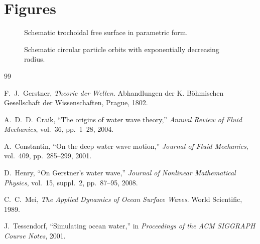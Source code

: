 \documentclass[journal,10pt,twocolumn]{IEEEtran}
\begin{document}
\section*{Figures}

\begin{figure}[!t]
    \centering
    \caption{Schematic trochoidal free surface in parametric form.}
    \label{fig:trochoid_surface}
\end{figure}

\begin{figure}[!t]
    \centering
    \caption{Schematic circular particle orbits with exponentially decreasing radius.}
    \label{fig:particle_orbits}
\end{figure}

\begin{thebibliography}{99}

F.~J.~Gerstner,
\emph{Theorie der Wellen}.
Abhandlungen der K. B\"ohmischen Gesellschaft der Wissenschaften, Prague, 1802.

A.~D.~D.~Craik,
``The origins of water wave theory,''
\emph{Annual Review of Fluid Mechanics}, vol.~36, pp.~1--28, 2004.

A.~Constantin,
``On the deep water wave motion,''
\emph{Journal of Fluid Mechanics}, vol.~409, pp.~285--299, 2001.

D.~Henry,
``On Gerstner's water wave,''
\emph{Journal of Nonlinear Mathematical Physics}, vol.~15, suppl.~2, pp.~87--95, 2008.

C.~C.~Mei,
\emph{The Applied Dynamics of Ocean Surface Waves}.
World Scientific, 1989.

J.~Tessendorf,
``Simulating ocean water,''
in \emph{Proceedings of the ACM SIGGRAPH Course Notes}, 2001.

\end{thebibliography}
\end{document}
